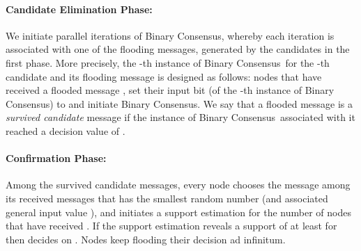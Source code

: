 \documentclass[leqno,11pt]{article}
\newcommand{\bc}{{\sc Binary Consensus}}
\begin{document}
\paragraph{Candidate Elimination Phase:}
  We  initiate  parallel
  iterations of \bc, whereby each iteration is associated with one of the   flooding messages, generated by the candidates in the first phase.
  More precisely, the -th instance of \bc\ for the -th candidate and its flooding message  is designed as follows:
  nodes that have received a flooded message , set
  their input bit (of the -th instance of \bc) to  and initiate \bc.
  We say that a flooded message  is
  a {\em survived candidate} message if the instance of \bc\ associated with it reached a
  decision value of . 
  

\paragraph{Confirmation Phase:} 
  Among the survived candidate messages, every node 
  chooses the message  among its received messages that has the smallest random number  (and associated general input value
  ), and initiates a support estimation for the number of nodes that have received .
  If the support estimation reveals a support of at least  for  then  decides on . 
  Nodes keep flooding their decision ad infinitum.
\end{document}

